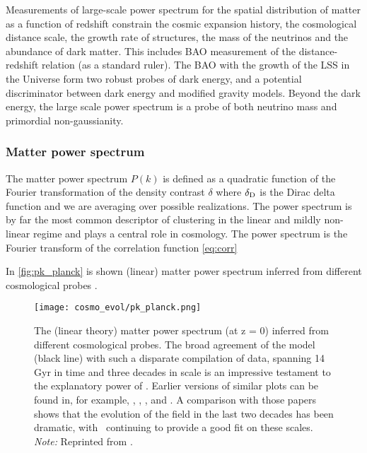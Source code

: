 Measurements of large-scale power spectrum for the spatial distribution of matter as a function of redshift constrain the cosmic expansion history, the cosmological distance scale, the growth rate of structures, the mass of the neutrinos and the abundance of dark matter. This includes BAO measurement of the distance-redshift relation (as a standard ruler). The BAO with the growth of the LSS in the Universe form two robust probes of dark energy, and a potential discriminator between dark energy and modified gravity models. Beyond the dark energy, the large scale power spectrum is a probe of both neutrino mass and primordial non-gaussianity.
\subsubsection{Matter power spectrum}
The matter power spectrum $P(k)$ is defined as a quadratic function of the Fourier transformation of the density contrast $\delta$
where $\delta_{\rm D}$ is the Dirac delta function and we are averaging over possible realizations. The power spectrum is by far the most common descriptor of clustering in the linear and mildly non-linear regime and plays a central role in cosmology. The power spectrum is the Fourier transform of the correlation function \eqref{eq:corr}

In \autoref{fig:pk_planck} is shown (linear) matter power spectrum inferred from different cosmological probes \parencite{2018arXiv180706205P}.

\begin{figure}[hbt]
    \centering
    \texttt{[image: cosmo\_evol/pk\_planck.png]}
    \caption{The (linear theory) matter power spectrum (at z = 0) inferred from different cosmological probes. The broad agreement of the model (black line) with such a disparate compilation of data, spanning 14 Gyr in time and three decades in scale is an impressive testament to the explanatory power of \LCDM. Earlier versions of similar plots can be found in, for example, \textcite{1994ARA&A..32..319W}, \textcite{1995Sci...268..829S}, \textcite{2002PhRvD..66j3508T}, and \textcite{2004ApJ...606..702T}. A comparison with those papers shows that the evolution of the field in the last two decades has been dramatic, with \LCDM\ continuing to provide a good fit on these scales. \textit{Note:} Reprinted from \textcite{2018arXiv180706205P}.}
    \label{fig:pk_planck}
\end{figure}

